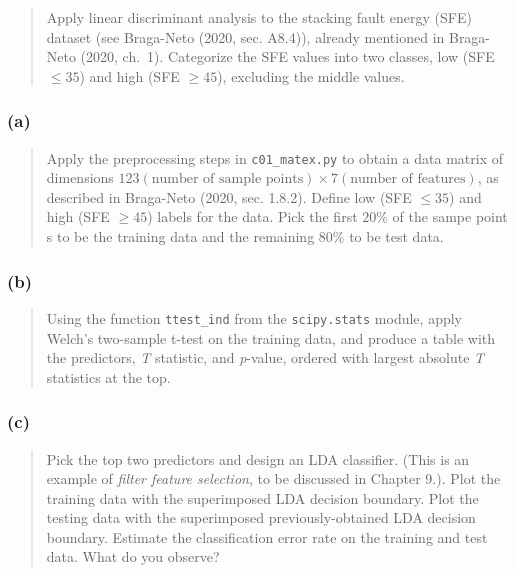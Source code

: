 \documentclass[
  letterpaper,
  DIV=11,
  numbers=noendperiod]{scrartcl}
\begin{document}
\begin{quote}
Apply linear discriminant analysis to the stacking fault energy (SFE)
dataset (see Braga-Neto (2020, sec. A8.4)), already mentioned in
Braga-Neto (2020, ch.~1). Categorize the SFE values into two classes,
low (SFE \(\leq 35\)) and high (SFE \(\geq 45\)), excluding the middle
values.
\end{quote}

\hypertarget{a-2}{%
\subsubsection{(a)}\label{a-2}}

\begin{quote}
Apply the preprocessing steps in \texttt{c01\_matex.py} to obtain a data
matrix of dimensions
\(123 (\text{number of sample points}) \times 7 (\text{number of features})\),
as described in Braga-Neto (2020, sec. 1.8.2). Define low (SFE
\(\leq 35\)) and high (SFE \(\geq 45\)) labels for the data. Pick the
first \(20\%\) of the sampe point s to be the training data and the
remaining \(80\%\) to be test data.
\end{quote}

\hypertarget{b-2}{%
\subsubsection{(b)}\label{b-2}}

\begin{quote}
Using the function \texttt{ttest\_ind} from the \texttt{scipy.stats}
module, apply Welch's two-sample t-test on the training data, and
produce a table with the predictors, \emph{T} statistic, and
\emph{p}-value, ordered with largest absolute \emph{T} statistics at the
top.
\end{quote}

\hypertarget{c-2}{%
\subsubsection{(c)}\label{c-2}}

\begin{quote}
Pick the top two predictors and design an LDA classifier. (This is an
example of \emph{filter feature selection}, to be discussed in Chapter
9.). Plot the training data with the superimposed LDA decision boundary.
Plot the testing data with the superimposed previously-obtained LDA
decision boundary. Estimate the classification error rate on the
training and test data. What do you observe?
\end{quote}
\end{document}
